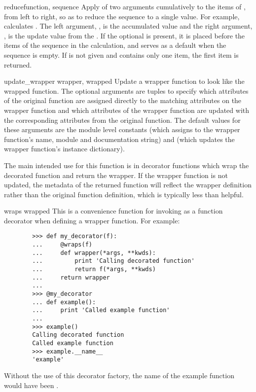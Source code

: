 \begin{funcdesc}{reduce}{function, sequence}
  Apply  of two arguments cumulatively to the items of
  , from left to right, so as to reduce the sequence to
  a single value.  For example,  calculates .  The left argument,
  , is the accumulated value and the right argument, ,
  is the update value from the .  If the optional
   is present, it is placed before the items of the
  sequence in the calculation, and serves as a default when the
  sequence is empty.  If  is not given and
   contains only one item, the first item is returned.
\end{funcdesc}

\begin{funcdesc}{update_wrapper}
{wrapper, wrapped}
Update a wrapper function to look like the wrapped function. The optional
arguments are tuples to specify which attributes of the original
function are assigned directly to the matching attributes on the wrapper
function and which attributes of the wrapper function are updated with
the corresponding attributes from the original function. The default
values for these arguments are the module level constants
 (which assigns to the wrapper function's name,
module and documentation string) and  (which
updates the wrapper function's instance dictionary).

The main intended use for this function is in decorator functions
which wrap the decorated function and return the wrapper. If the
wrapper function is not updated, the metadata of the returned function
will reflect the wrapper definition rather than the original function
definition, which is typically less than helpful.
\end{funcdesc}

\begin{funcdesc}{wraps}
{wrapped}
This is a convenience function for invoking
as a function decorator when defining a wrapper function. For example:
  \begin{verbatim}
        >>> def my_decorator(f):
        ...     @wraps(f)
        ...     def wrapper(*args, **kwds):
        ...         print 'Calling decorated function'
        ...         return f(*args, **kwds)
        ...     return wrapper
        ...
        >>> @my_decorator
        ... def example():
        ...     print 'Called example function'
        ...
        >>> example()
        Calling decorated function
        Called example function
        >>> example.__name__
        'example'
  \end{verbatim}
Without the use of this decorator factory, the name of the example
function would have been .
\end{funcdesc}


